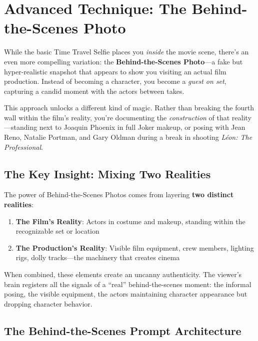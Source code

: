 \section{Advanced Technique: The Behind-the-Scenes Photo}
\label{sec:bts-photo}

While the basic Time Travel Selfie places you \textit{inside} the movie scene, there's an even more compelling variation: the \textbf{Behind-the-Scenes Photo}—a fake but hyper-realistic snapshot that appears to show you visiting an actual film production. Instead of becoming a character, you become a \textit{guest on set}, capturing a candid moment with the actors between takes.

This approach unlocks a different kind of magic. Rather than breaking the fourth wall within the film's reality, you're documenting the \textit{construction} of that reality—standing next to Joaquin Phoenix in full Joker makeup, or posing with Jean Reno, Natalie Portman, and Gary Oldman during a break in shooting \textit{Léon: The Professional}.

\subsection{The Key Insight: Mixing Two Realities}

The power of Behind-the-Scenes Photos comes from layering \textbf{two distinct realities}:

\begin{enumerate}
\item \textbf{The Film's Reality}: Actors in costume and makeup, standing within the recognizable set or location
\item \textbf{The Production's Reality}: Visible film equipment, crew members, lighting rigs, dolly tracks—the machinery that creates cinema
\end{enumerate}

When combined, these elements create an uncanny authenticity. The viewer's brain registers all the signals of a ``real'' behind-the-scenes moment: the informal posing, the visible equipment, the actors maintaining character appearance but dropping character behavior.

\subsection{The Behind-the-Scenes Prompt Architecture}

